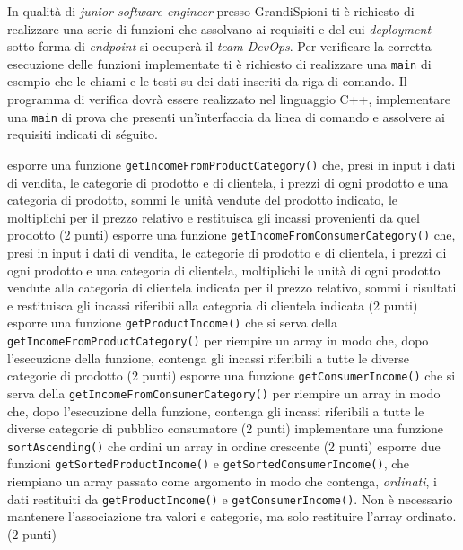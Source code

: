 \documentclass[a4paper, 11pt]{exam}
\begin{document}
In qualità di \textit{junior software engineer} presso GrandiSpioni ti è richiesto di realizzare una serie di funzioni che assolvano ai requisiti e del cui \emph{deployment} sotto forma di \emph{endpoint} si occuperà il \emph{team DevOps}. 
Per verificare la corretta esecuzione delle funzioni implementate  ti è richiesto di realizzare una \texttt{main} di esempio che le chiami e le testi su dei dati inseriti da riga di comando.
Il programma di verifica dovrà essere realizzato nel linguaggio C++, implementare una \texttt{main} di prova che presenti un'interfaccia da linea di comando e assolvere ai requisiti indicati di séguito.

\begin{questions}
	\question esporre una funzione \texttt{getIncomeFromProductCategory()} che, presi in input i dati di vendita, le categorie di prodotto e di clientela, i prezzi di ogni prodotto e una categoria di prodotto, sommi le unità vendute del prodotto indicato, le moltiplichi per il prezzo relativo e restituisca gli incassi provenienti da quel prodotto (2 punti)
	\question esporre una funzione \texttt{getIncomeFromConsumerCategory()} che, presi in input i dati di vendita, le categorie di prodotto e di clientela, i prezzi di ogni prodotto e una categoria di clientela, moltiplichi le unità di ogni prodotto vendute alla categoria di clientela indicata per il prezzo relativo, sommi i risultati e restituisca gli incassi riferibii alla categoria di clientela indicata (2 punti)
	\question esporre una funzione \texttt{getProductIncome()} che si serva della  \texttt{getIncomeFromProductCategory()} per riempire un array in modo che, dopo l'esecuzione della funzione, contenga gli incassi riferibili a tutte le diverse categorie di prodotto (2 punti)
	\question esporre una funzione \texttt{getConsumerIncome()} che si serva della  \texttt{getIncomeFromConsumerCategory()} per riempire un array in modo che, dopo l'esecuzione della funzione, contenga gli incassi riferibili a tutte le diverse categorie di pubblico consumatore (2 punti)
	\question implementare una funzione \texttt{sortAscending()} che ordini un array in ordine crescente (2 punti)
	\question esporre due funzioni \texttt{getSortedProductIncome()} e \texttt{getSortedConsumerIncome()}, che riempiano un array passato come argomento in modo che contenga, \emph{ordinati}, i dati restituiti da \texttt{getProductIncome()}  e  \texttt{getConsumerIncome()}. Non è necessario mantenere l'associazione tra valori e categorie, ma solo restituire l'array ordinato. (2 punti)
\end{questions}
\end{document}
